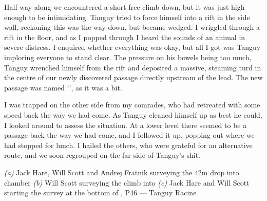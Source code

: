Half way along we encountered a short free climb down, but it was just high enough to be intimidating. Tanguy tried to force himself into a rift in the side wall, reckoning this was the way down, but became wedged. I wriggled through a rift in the floor, and as I popped through I heard the sounds of an animal in severe distress. I enquired whether everything was okay, but all I got was Tanguy imploring everyone to stand clear. The pressure on his bowels being too much, Tanguy wrenched himself from the rift and deposited a massive, steaming turd in the centre of our newly discovered passage directly upstream of the lead. The new passage was named ‘’, as it was a bit.
 
I was trapped on the other side from my comrades, who had retreated with some speed back the way we had come. As Tanguy cleaned himself up as best he could, I looked around to assess the situation. At a lower level there seemed to be a passage back the way we had come, and I followed it up, popping out where we had stopped for lunch. I hailed the others, who were grateful for an alternative route, and we soon regrouped on the far side of Tanguy’s shit.

\begin{pagefigure}
    \centering
    \begin{subfigure}[t]{0.393\textwidth}
        \centering
        \caption{} \label{Hall of the Mountain King}
    \end{subfigure}
    \hfill
    \begin{subfigure}[t]{0.59\textwidth}
        \centering
        \caption{} \label{Colony}
    \end{subfigure}

    \vspace{0.3cm}
    \begin{subfigure}[t]{\textwidth}
    \centering
        \caption{} \label{Bottom of Blue Danube}
    \end{subfigure}
    
    \caption{
    \textit{(a)} Jack Hare, Will Scott and Andrej Fratnik surveying the 42m drop into \protect{} chamber
    \textit{(b)} Will Scott surveying the climb into \protect{}
    \textit{(c)} Jack Hare and Will Scott starting the survey at the bottom of \protect{}, P46 --- Tanguy Racine }

\end{pagefigure}


